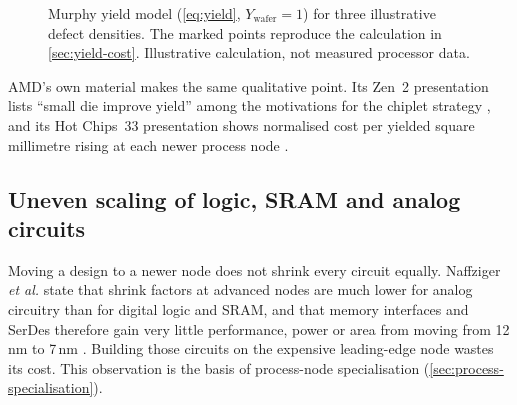 \begin{figure}[htbp]
\centering
{}
\caption[Murphy yield model for three illustrative defect densities]{Murphy yield model (\cref{eq:yield}, $Y_{\mathrm{wafer}}=1$) for three illustrative defect densities. The marked points reproduce the calculation in \cref{sec:yield-cost}. Illustrative calculation, not measured processor data.}
\label{fig:yield-curve}
\end{figure}

AMD's own material makes the same qualitative point. Its Zen~2 presentation lists ``small die improve yield'' among the motivations for the chiplet strategy \cite{suggs2019zen2}, and its Hot Chips~33 presentation shows normalised cost per yielded square millimetre rising at each newer process node \cite{swaminathanAdvancedPackagingEnabling2021}.

\subsection{Uneven scaling of logic, SRAM and analog circuits}
\label{sec:uneven-scaling}
Moving a design to a newer node does not shrink every circuit equally. Naffziger \emph{et al.} state that shrink factors at advanced nodes are much lower for analog circuitry than for digital logic and SRAM, and that memory interfaces and SerDes therefore gain very little performance, power or area from moving from 12\,nm to 7\,nm \cite{naffziger2020chiplet}. Building those circuits on the expensive leading-edge node wastes its cost. This observation is the basis of process-node specialisation (\cref{sec:process-specialisation}).


